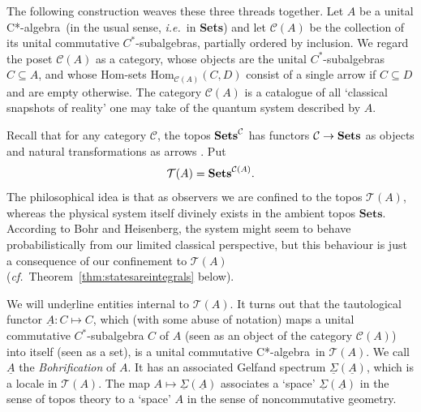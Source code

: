 \documentclass[12pt]{article}
\newcommand{\beq}{\begin{equation}}
\newcommand{\eeq}{\end{equation}}
\newcommand{\Sets}{\mbox{\textbf{Sets}}}
\newcommand{\ca}{C*-algebra} \newcommand{\jba}{JB-algebra}
\newcommand{\raw}{\rightarrow} \newcommand{\rat}{\mapsto}
\newcommand{\CA}{{\mathcal A}} \newcommand{\CB}{{\mathcal B}}
\newcommand{\alg}[1]{\ensuremath{#1}}
\newcommand{\functor}[1]{\ensuremath{\underline{#1}}}
\newcommand{\Cat}[1]{\ensuremath{\mathrm{\textbf{#1}}}}
\newcommand{\Set}{\Cat{Sets}\xspace}
\newcommand{\context}{\ensuremath{\mathcal{C}}}
\newcommand{\asstopos}{\ensuremath{\mathcal{T}}}
\newcommand{\uA}{\underline{A}}
\renewcommand{\CA}{\mathcal{C}(A)}
\newcommand{\TA}{\mathcal{T}(A)}
\newcommand{\ie}{\textit{i.e.}}
\newcommand{\ulS}{\functor{\Sigma}}
\newcommand{\ulA}{\underline{A}}
\renewcommand{\TA}{\asstopos(\alg{A})}
\renewcommand{\CA}{\context(\alg{A})}
\begin{document}
The following construction  weaves these three threads together.
 Let $A$ be a unital \ca\ (in the usual sense, \ie\ in \Sets)
and let $\CA$ be the collection of its unital
commutative $C^*$-subalgebras, partially ordered by inclusion. We
regard the poset $\CA$ as a category, whose objects are
the  unital $C^*$-subalgebras $C\subseteq A$, and whose Hom-sets
$\mathrm{Hom}_{\CA}(C,D)$ consist of a single arrow if
$C\subseteq D$ and are empty otherwise. The category $\CA$ is a catalogue of all
`classical snapshots of reality' one may take of the quantum system described by
$A$.

Recall that for any category $\mathcal{C}$,
the topos $\Sets^{\mathcal{C}}$ has functors
$\mathcal{C}\raw\Sets$ as objects  and natural
transformations as arrows \cite{maclanemoerdijk92}.
 Put
\beq
  \asstopos(\alg{A})=\Sets^{\CA}.\label{defTA}
\eeq
The philosophical idea is that  as
observers we are confined to the topos $\asstopos(\alg{A})$, whereas
the physical system itself divinely  exists in the ambient topos
$\Set$. According to Bohr and Heisenberg, the system
might seem to behave probabilistically from our limited classical
perspective, but this behaviour  is just a consequence of our confinement to
$\asstopos(\alg{A})$ ({\it cf.}\ Theorem~\ref{thm:statesareintegrals} below).

We will $\underline{\mathrm{underline}}$ entities internal to $\TA$.
It turns out that the tautological functor
$\ulA:C\mapsto C$, which (with some abuse of notation) maps a  unital
commutative $C^*$-subalgebra $C$ of $A$ (seen as an object of the
category $\CA$) into itself (seen as a set), is a unital
commutative \ca\ in $\asstopos(\alg{A})$. We call $\ulA$ the {\it Bohrification}
of $A$.
It has an
associated Gelfand spectrum $\ulS(\uA)$, which is a locale in $\TA$. The map
$A\mapsto \ulS(\uA)$
associates a `space' $\ulS(\uA)$ in the sense of topos theory to a `space' $A$
in the sense of noncommutative geometry.
\end{document}
